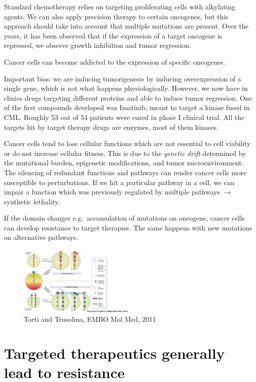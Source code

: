 Standard chemotherapy relies on targeting proliferating cells with alkylating agents. We can also apply precision therapy to certain oncogenes, but this approach should take into account that multiple mutations are present. Over the years, it has been observed that if the expression of a target oncogene is repressed, we observe growth inhibition and tumor regression.

Cancer cells can become addicted to the expression of specific oncogenes.

Important bias: we are inducing tumorigenesis by inducing overexpression of a single gene, which is not what happens physiologically. However, we now have in clinics drugs targeting different proteins and able to induce tumor regression. One of the first compounds developed was Imatinib, meant to target a kinase fused in CML. Roughly 53 out of 54 patients were cured in phase I clinical trial. All the targets hit by target therapy drugs are enzymes, most of them kinases.

Cancer cells tend to lose cellular functions which are not essential to cell viability or do not increase cellular fitness. This is due to the \emph{genetic drift} determined by the mutational burden, epigenetic modifications, and tumor microenvironment. The silencing of redundant functions and pathways can render cancer cells more susceptible to perturbations. If we hit a particular pathway in a cell, we can impair a function which was previously regulated by multiple pathways $\rightarrow$ synthetic lethality.

If the domain changes e.g.~accumulation of mutations on oncogene, cancer cells can develop resistance to target therapies. The same happens with new mutations on alternative pathways.

\begin{figure}
\centering
\includegraphics[width=0.5\textwidth]{../_resources/Screen_Shot_2022-11-04_at_11-25-54.png}
\caption{Torti and Trusolino, EMBO Mol Med, 2011}
\end{figure}

\section{Targeted therapeutics generally lead to resistance}

